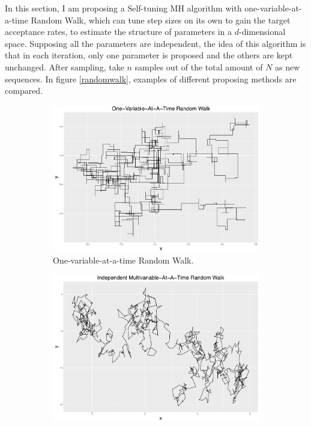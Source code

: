 In this section, I am proposing a Self-tuning MH algorithm with one-variable-at-a-time Random Walk, which can tune step sizes on its own to gain the target acceptance rates, to estimate the structure of parameters in a $d$-dimensional space. Supposing all the parameters are independent, the idea of this algorithm is that in each iteration, only one parameter is proposed and the others are kept unchanged. After sampling, take $n$ samples out of the total amount of $N$ as new sequences. In figure \ref{randomwalk}, examples of different proposing methods are compared. 
\begin{figure}[h]
\centering
 \begin{subfigure}[b]{0.32\textwidth}
     \includegraphics[width=\textwidth]{Chapters/05MCMCOU/plots/ggoneRW.pdf}
     \caption{\footnotesize One-variable-at-a-time Random Walk.}\label{MCMConevariableRW}
\end{subfigure}
\begin{subfigure}[b]{0.32\textwidth}
     \includegraphics[width=\textwidth]{Chapters/05MCMCOU/plots/ggindRW.pdf}

\end{subfigure}
\end{figure}
